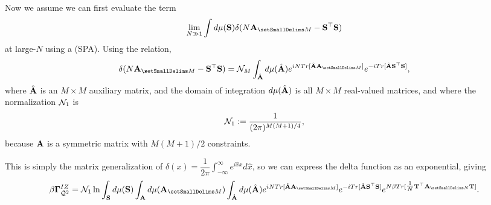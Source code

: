 Now we assume we can first evaluate the term 
\begin{align}
  \lim_{N\gg 1} \int d\mu(\SMAT)    \delta(N\AMATM-\SMAT^{\top}\SMAT)
\end{align}
at large-$N$ using a \SaddlePointApproximation (SPA). Using the relation, 
\begin{align}
\delta(N\AMATM-\SMAT^{\top}\SMAT)
   =\mathcal{N}_M\INTAHAT  d\mu(\AHAT) e^{ iN Tr[\AHAT\AMATM] } e^{ -i Tr[\AHAT\SMAT^{\top}\SMAT] }  ,
\end{align}
where $\hat{\mathbf{A}}$ is an $M \times M$ auxiliary matrix, and the domain of integration $d\mu(\hat{\mathbf{A}})$ is all $M \times M$ real-valued matrices, and where the normalization $\mathcal{N}_1$ is
\begin{align}
  \label{eqn:norm_1}
\mathcal{N}_1:=\frac{1}{(2\pi)^{M(M+1)/4}},
\end{align}
because $\mathbf{A}$ is a symmetric matrix with $M(M+1)/2$ constraints.

This is simply the matrix generalization of
$\delta(x)=\dfrac{1}{2\pi}\int_{-\infty}^{\infty} e^{i\hat{x}x}d\hat{x}$,
so we can express the delta function as an exponential, giving
\begin{align}
\label{eqn:Q2}
\IZG = \NORM_1 \ln\INTS  d\mu(\SMAT) \INTA d\mu(\AMATM) 
                           \INTAHAT d\mu(\AHAT) e^{ iN Tr[ \AHAT\AMATM ] }
                           e^{ -i Tr[ \AHAT\SMAT^{\top} \SMAT ] }
                           e^{  N\beta Tr[\tfrac{1}{N} \TMAT^{\top}\AMATN\TMAT ] } .
\end{align}

